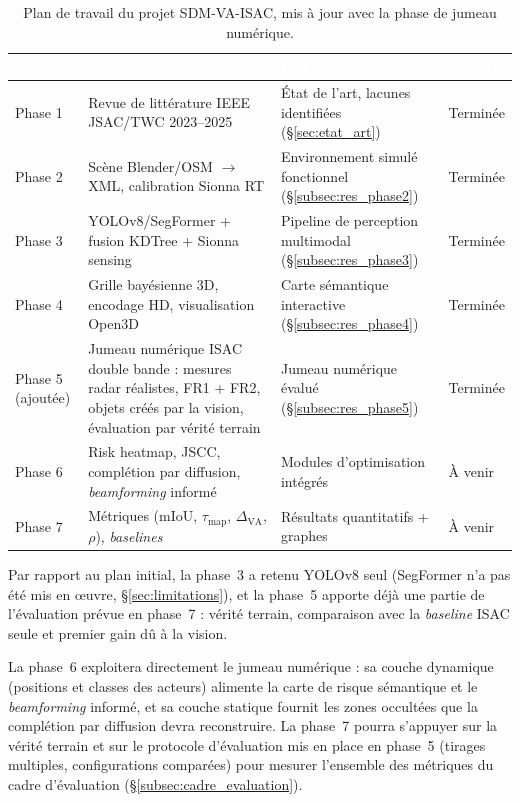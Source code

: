 \documentclass[12pt,a4paper,titlepage]{article}
\newcommand{\hd}[1]{\textcolor{white}{\textbf{#1}}}
\newcommand{\choix}{\rowcolor{tabchoice}}
\begin{document}
\begin{table}[H]
    \centering
    \caption{Plan de travail du projet SDM-VA-ISAC, mis à jour avec la phase de jumeau numérique.}
    \label{tab:feuille_route}
    \begin{tabularx}{\textwidth}{>{\centering\arraybackslash}p{1.6cm}LL>{\centering\arraybackslash}p{2.1cm}}
        \toprule
        \hd{Phase} & \hd{Tâches} & \hd{Livrables} & \hd{Statut} \\
        \midrule
        Phase 1 & Revue de littérature IEEE JSAC/TWC 2023--2025 & État de l'art, lacunes identifiées (\S\ref{sec:etat_art}) & Terminée \\
        Phase 2 & Scène Blender/OSM $\to$ XML, calibration Sionna RT & Environnement simulé fonctionnel (\S\ref{subsec:res_phase2}) & Terminée \\
        Phase 3 & YOLOv8/SegFormer + fusion KDTree + Sionna sensing & Pipeline de perception multimodal (\S\ref{subsec:res_phase3}) & Terminée \\
        Phase 4 & Grille bayésienne 3D, encodage HD, visualisation Open3D & Carte sémantique interactive (\S\ref{subsec:res_phase4}) & Terminée \\
        Phase 5 \newline \footnotesize(ajoutée) & Jumeau numérique ISAC double bande : mesures radar réalistes, FR1 + FR2, objets créés par la vision, évaluation par vérité terrain & Jumeau numérique évalué (\S\ref{subsec:res_phase5}) & Terminée \\
        \choix Phase 6 & Risk heatmap, JSCC, complétion par diffusion, \textit{beamforming} informé & Modules d'optimisation intégrés & À venir \\
        \choix Phase 7 & Métriques (mIoU, $\tau_{\text{map}}$, $\Delta_{\text{VA}}$, $\rho$), \textit{baselines} & Résultats quantitatifs + graphes & À venir \\
        \bottomrule
    \end{tabularx}
\end{table}

Par rapport au plan initial, la phase~3 a retenu YOLOv8 seul (SegFormer n'a pas été mis en \oe uvre, \S\ref{sec:limitations}), et la phase~5 apporte déjà une partie de l'évaluation prévue en phase~7 : vérité terrain, comparaison avec la \textit{baseline} ISAC seule et premier gain dû à la vision.

La phase~6 exploitera directement le jumeau numérique : sa couche dynamique (positions et classes des acteurs) alimente la carte de risque sémantique et le \textit{beamforming} informé, et sa couche statique fournit les zones occultées que la complétion par diffusion devra reconstruire. La phase~7 pourra s'appuyer sur la vérité terrain et sur le protocole d'évaluation mis en place en phase~5 (tirages multiples, configurations comparées) pour mesurer l'ensemble des métriques du cadre d'évaluation (\S\ref{subsec:cadre_evaluation}).
\end{document}
